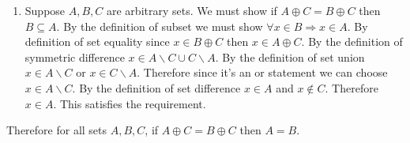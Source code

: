 \documentclass[12pt, letterpaper]{article}
\begin{document}
\begin{enumerate}
\begin{enumerate}
		\item Suppose $A,B,C$ are arbitrary sets. We must show if $A \oplus C=B \oplus C$ then $B \subseteq A$. By the definition of subset we must show $\forall x \in B \Rightarrow x \in A$.  By definition of set equality since $x \in B \oplus C$ then $x \in A \oplus C.$ By the definition of symmetric difference $x \in A \backslash C \cup C \backslash A.$ By the definition of set union $x \in A \backslash C$ or $x \in C \backslash A.$ Therefore since it's an or statement we can choose $x \in A \backslash C$.  By the definition of set difference $x \in A$ and $x \not\in C.$  Therefore $x \in A.$  This satisfies the requirement. 
	\end{enumerate}
	Therefore for all sets $A, B, C$, if $A \oplus C=B \oplus C$ then $A=B$.
\end{enumerate}		
	
\end{document}

